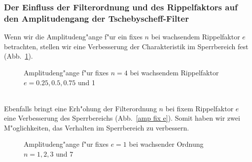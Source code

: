 \subsubsection{Der Einfluss der Filterordnung und des Rippelfaktors auf den  
  Amplitudengang der Tschebyscheff-Filter}
Wenn wir die Amplitudeng"ange f"ur ein fixes $n$ bei wachsendem
Rippelfaktor $e$ betrachten, stellen wir eine Verbesserung der
Charakteristik im Sperrbereich fest (Abb.~\ref{amp fix n}). 
\vspace*{-3mm} \begin{figure}[!htb] %
 \begin{center}
  \vspace*{-2mm}\caption{Amplitudeng"ange f"ur fixes $n=4$ bei wachsendem Rippelfaktor $e=0.25, 0.5, 0.75$ und 1}\label{amp fix n}
\end{center}
\end{figure}\\
Ebenfalls bringt eine Erh"ohung der Filterordnung $n$ bei fixem
Rippelfaktor $e$ eine Verbesserung des Sperrbereichs (Abb.~\ref{amp
  fix e}). Somit haben wir zwei M"oglichkeiten, das Verhalten im
Sperrbereich zu verbessern.\\
\vspace*{-3mm} %
\begin{figure}[!htb]
 \begin{center}
  \vspace*{-2mm}\caption{Amplitudeng"ange f"ur fixes $e=1$ bei wachsender Ordnung $n=1, 2, 3$ und 7}
 \label{amp fix e}
\end{center}
\vspace*{-6mm} 
\end{figure}
\newpage
